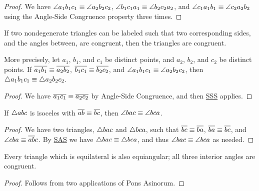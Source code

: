 \begin{proof}
We have \(\angle{a_1b_1c_1} \equiv \angle{a_2b_2c_2}\), \(\angle{b_1c_1a_1} \equiv \angle{b_2c_2a_2}\), and \(\angle{c_1a_1b_1} \equiv \angle{c_2a_2b_2}\) using the Angle-Side Congruence property three times.
\end{proof}

\begin{prop}\label{prop:sas-theorem}
If two nondegenerate triangles can be labeled such that two corresponding sides, and the angles between, are congruent, then the triangles are congruent.

More precisely, let \(a_1\), \(b_1\), and \(c_1\) be distinct points, and \(a_2\), \(b_2\), and \(c_2\) be distinct points.
If \(\overline{a_1b_1} \equiv \overline{a_2b_2}\), \(\overline{b_1c_1} \equiv \overline{b_2c_2}\), and \(\angle{a_1b_1c_1} \equiv \angle{a_2b_2c_2}\), then \(\bigtriangleup{a_1b_1c_1} \equiv \bigtriangleup{a_2b_2c_2}\).
\end{prop}

\begin{proof}
We have \(\overline{a_1c_1} \equiv \overline{a_2c_2}\) by Angle-Side Congruence, and then \hyperref[prop:sss-theorem]{SSS} applies.
\end{proof}

\begin{cor}\label{cor:pons-asinorum}
If \(\bigtriangleup{abc}\) is isoceles with \(\overline{ab} \equiv \overline{bc}\), then \(\angle{bac} \equiv \angle{bca}\).
\end{cor}

\begin{proof}
We have two triangles, \(\bigtriangleup{bac}\) and \(\bigtriangleup{bca}\), such that \(\overline{bc}\equiv \overline{ba}\), \(\overline{ba} \equiv \overline{bc}\), and \(\angle{cba} \equiv \overline{ab}{c}\).
By \hyperref[prop:sas-theorem]{SAS} we have \(\bigtriangleup{bac} \equiv \bigtriangleup{bca}\), and thus \(\angle{bac} \equiv \angle{bca}\) as needed.
\end{proof}

\begin{cor}
Every triangle which is equilateral is also equiangular; all three interior angles are congruent.
\end{cor}

\begin{proof}
Follows from two applications of Pons Asinorum.
\end{proof}

